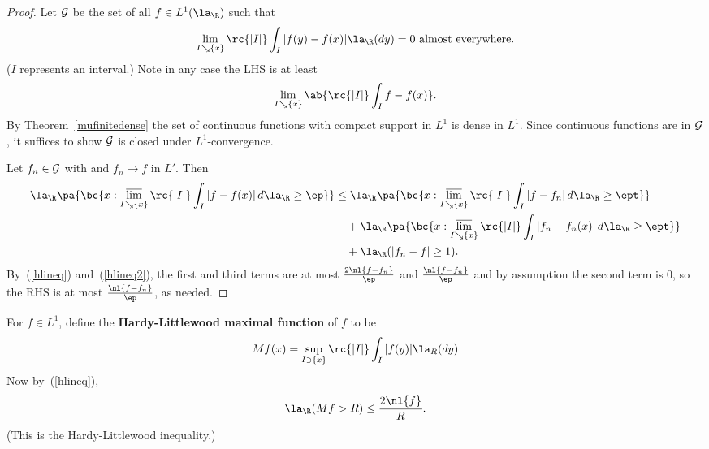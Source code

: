 \begin{proof}
Let $\cal G$ %
be the set of all $f\in L^1(\la_{\R})$ such that 
\[\lim_{I\searrow \{x\}} \rc{|I|}\int_{I}|f(y)-f(x)|\la_{\R}(dy)=0\text{ almost everywhere.}\]
($I$ represents an interval.)
Note in any case the LHS is at least
\begin{equation}\label{hlineq2}
\lim_{I\searrow\{x\}} \ab{
\rc{|I|}\int_I f-f(x)}.
\end{equation}
By Theorem~\ref{mufinitedense} the set of continuous functions with compact support in $L^1$ is dense in $L^1$.
Since continuous functions are in $\cal G$, it suffices to show $\cal G$ is closed under $L^1$-convergence.

Let $f_n\in \cal G$ with and $f_n\to f$ in $L'$. Then
\begin{align*}
\la_{\R}\pa{
\bc{x:\varlimsup_{I\searrow \{x\}} \rc{|I|} \int_I|f-f(x)|\,d\la_{\R} \ge \ep}}
&\le 
\la_{\R}\pa{\bc{
x:\varlimsup_{I\searrow \{x\}} \rc{|I|} \int_{I}|f-f_n|\,d\la_{\R}\ge \ept
}}\\
&\quad +
\la_{\R}\pa{\bc{
x:\varlimsup_{I\searrow \{x\}} \rc{|I|} \int_{I}|f_n-f_n(x)|\,d\la_{\R}\ge \ept
}}\\
&\quad +\la_{\R}(|f_n-f|\ge 1).
\end{align*}
By~(\ref{hlineq}) and~(\ref{hlineq2}), the first and third terms are at most $\frac{2\nl{f-f_n}}{\ep}$ and $\frac{\nl{f-f_n}}{\ep}$ and by assumption the second term is 0, so the RHS is at most $\frac{\nl{f-f_n}}{\ep}$, as needed.


\end{proof}
For $f\in L^1$, define the \textbf{Hardy-Littlewood maximal function} of $f$ to be
\[
Mf(x)=\sup_{I\ni\{x\}}\rc{|I|} \int_I|f(y)|\la_R(dy)
\]
Now by~(\ref{hlineq}),
\[
\la_{\R} (Mf>R)\le \frac{2\nl{f}}{R}.
\]
(This is the Hardy-Littlewood inequality.)